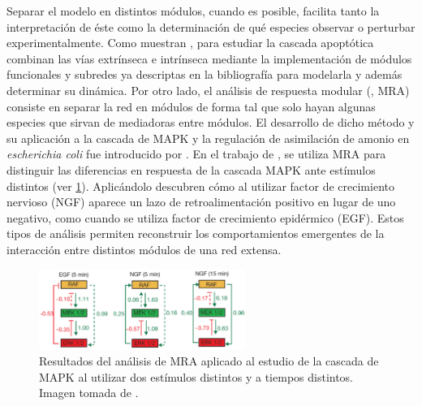 Separar el modelo en distintos módulos, cuando es posible, facilita tanto la interpretación de éste como la determinación de qué especies observar o perturbar  experimentalmente. Como muestran \cite{Harrington2008}, para estudiar la cascada apoptótica combinan las vías extrínseca e intrínseca mediante la implementación de módulos funcionales y subredes ya descriptas en la bibliografía para modelarla y además determinar su dinámica. Por otro lado, el análisis de respuesta modular (, MRA) consiste en separar la red en módulos de forma tal que solo hayan algunas especies que sirvan de mediadoras entre módulos. El desarrollo de dicho método y su aplicación a la cascada de MAPK y la regulación de asimilación de amonio en \textit{escherichia coli} fue introducido por \cite{Bruggeman2002}. En el trabajo de \cite{Santos2007}, se utiliza MRA para distinguir las diferencias en respuesta de la cascada MAPK ante estímulos distintos (ver \cref{fig:mra_ejemplo}). Aplicándolo descubren cómo al utilizar factor de crecimiento nervioso (NGF) aparece un lazo de retroalimentación positivo en lugar de uno negativo, como cuando se utiliza factor de crecimiento epidérmico (EGF). Estos tipos de análisis permiten reconstruir los comportamientos emergentes de la interacción entre distintos módulos de una red extensa.

\begin{figure}
    \centering
    \includegraphics[width=0.6\textwidth]{img/cap_1/mra_example.pdf}
    \caption{\footnotesize{Resultados del análisis de MRA aplicado al estudio de la cascada de MAPK al utilizar dos estímulos distintos y a tiempos distintos. Imagen tomada de \cite{Santos2007}.}}
    \label{fig:mra_ejemplo}
\end{figure}

